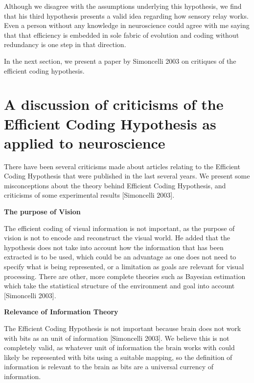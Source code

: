 \documentclass[twoside]{article}
\begin{document}
\begin{multicols}{2}
Although we disagree with the assumptions underlying this hypothesis, we find that his third hypothesis presents a valid idea regarding how sensory relay works. Even a person without any knowledge in neuroscience could agree with me saying that that efficiency is embedded in sole fabric of evolution and coding without redundancy is one step in that direction.

In the next section, we present a paper by Simoncelli 2003 on critiques of the efficient coding hypothesis. 




\section{A discussion of criticisms of the Efficient Coding Hypothesis as applied to neuroscience}

There have been several criticisms made about articles relating to the Efficient Coding Hypothesis that were published in the last several years. We present some misconceptions about the theory behind Efficient Coding Hypothesis, and criticisms of some experimental results [Simoncelli 2003].

\noindent\textbf{The purpose of Vision}

The efficient coding of visual information is not important, as the purpose of vision is not to encode and reconstruct the visual world. He added that the hypothesis does not take into account how the information that has been extracted is to be used, which could be an advantage as one does not need to specify what is being represented, or a limitation as goals are relevant for visual processing. There are other, more complete theories such as Bayesian estimation which take the statistical structure of the environment and goal into account [Simoncelli 2003].

\noindent\textbf{Relevance of Information Theory}

The Efficient Coding Hypothesis is not important because brain does not work with bits as an unit of information [Simoncelli 2003]. We believe this is not completely valid, as whatever unit of information the brain works with could likely be represented with bits using a suitable mapping, so the definition of information is relevant to the brain as bits are a universal currency of information.


\end{multicols}
\end{document}
